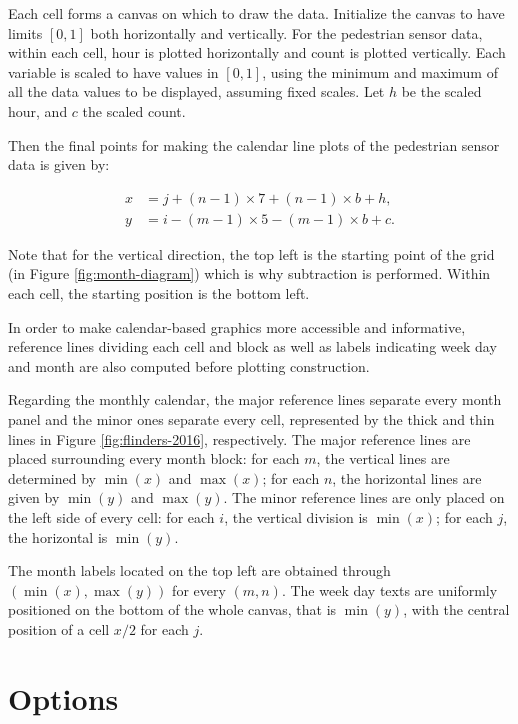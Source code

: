 \documentclass[article]{jss}
\theoremstyle{definition}
\theoremstyle{definition}
\theoremstyle{remark}
\begin{document}
Each cell forms a canvas on which to draw the data. Initialize the
canvas to have limits \([0, 1]\) both horizontally and vertically. For
the pedestrian sensor data, within each cell, hour is plotted
horizontally and count is plotted vertically. Each variable is scaled to
have values in \([0,1]\), using the minimum and maximum of all the data
values to be displayed, assuming fixed scales. Let \(h\) be the scaled
hour, and \(c\) the scaled count.

Then the final points for making the calendar line plots of the
pedestrian sensor data is given by:

\begin{equation}
  \begin{aligned}
  x &= j + (n - 1) \times 7 + (n - 1) \times b + h, \\
  y &= i - (m - 1) \times 5 - (m - 1) \times b + c. \label{eq:final}
  \end{aligned}
\end{equation}

Note that for the vertical direction, the top left is the starting point
of the grid (in Figure \ref{fig:month-diagram}) which is why subtraction
is performed. Within each cell, the starting position is the bottom
left.

In order to make calendar-based graphics more accessible and
informative, reference lines dividing each cell and block as well as
labels indicating week day and month are also computed before plotting
construction.

Regarding the monthly calendar, the major reference lines separate every
month panel and the minor ones separate every cell, represented by the
thick and thin lines in Figure \ref{fig:flinders-2016}, respectively.
The major reference lines are placed surrounding every month block: for
each \(m\), the vertical lines are determined by \(\min{(x)}\) and
\(\max{(x)}\); for each \(n\), the horizontal lines are given by
\(\min{(y)}\) and \(\max{(y)}\). The minor reference lines are only
placed on the left side of every cell: for each \(i\), the vertical
division is \(\min{(x)}\); for each \(j\), the horizontal is
\(\min{(y)}\).

The month labels located on the top left are obtained through
\((\min{(x)}, \max{(y)})\) for every \((m, n)\). The week day texts are
uniformly positioned on the bottom of the whole canvas, that is
\(\min{(y)}\), with the central position of a cell \(x / 2\) for each
\(j\).

\section{Options}\label{options}
\end{document}
